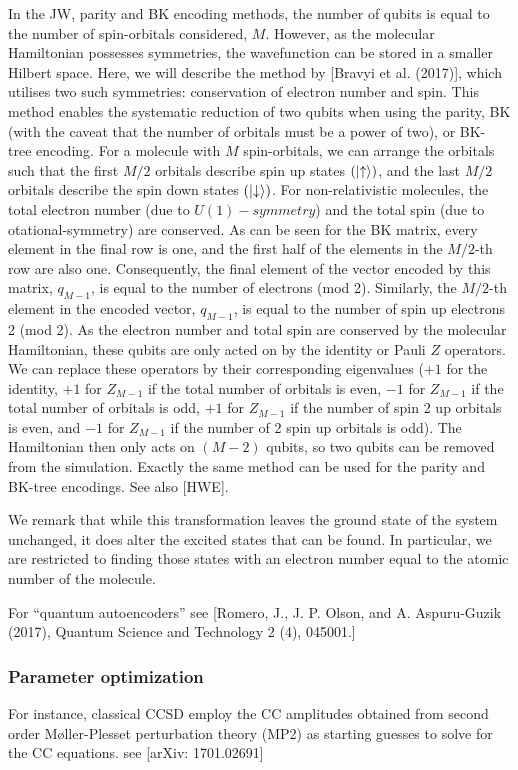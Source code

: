 \documentclass[11pt, oneside]{article}   	%
\begin{document}
In the JW, parity and BK encoding methods, the number of qubits is equal to the number of spin-orbitals considered, $M$. 
However, as the molecular Hamiltonian possesses symmetries, the wavefunction can be stored in a smaller Hilbert space. 
Here, we will describe the method by [Bravyi et al. (2017)], which utilises two such symmetries: conservation of electron number and spin. 
This method enables the systematic reduction of two qubits when using the parity, BK (with the caveat that the number of orbitals must be a power of two), or BK- tree encoding. 
For a molecule with $M$ spin-orbitals, we can arrange the orbitals such that the first $M/2$ orbitals describe spin up states $(\ket{\uparrow})$, and the last $M/2$ orbitals describe the spin down states $(\ket{\downarrow})$. 
For non-relativistic molecules, the total electron number (due to $U(1)-symmetry$) and the total spin (due to otational-symmetry) are conserved. 
As can be seen for the BK matrix, every element in the final row is one, and the first half of the elements in the $M/2$-th row are also one.
Consequently, the final element of the vector encoded by this matrix, $q_{M-1}$, is equal to the number of electrons (mod 2). 
Similarly, the $M/2$-th element in the encoded vector, $q_{M-1}$, is equal to the number of spin up electrons 2 (mod 2). 
As the electron number and total spin are conserved by the molecular Hamiltonian, these qubits are only acted on by the identity or Pauli $Z$ operators. 
We can replace these operators by their corresponding eigenvalues ($+1$ for the identity, $+1$ for $Z_{M-1}$ if the total number of orbitals is even, $-1$ for $Z_{M-1}$ if the total number of orbitals is odd, $+1$ for $Z_{M-1}$ if the number of spin 2 up orbitals is even, and $-1$ for $Z_{M-1}$ if the number of 2 spin up orbitals is odd). 
The Hamiltonian then only acts on $(M-2)$ qubits, so two qubits can be removed from the simulation. 
Exactly the same method can be used for the parity and BK-tree encodings. 
See also [HWE].

We remark that while this transformation leaves the ground state of the system unchanged, it does alter the excited states that can be found. 
In particular, we are restricted to finding those states with an electron number equal to the atomic number of the molecule.

For ``quantum autoencoders'' see [Romero, J., J. P. Olson, and A. Aspuru-Guzik (2017), Quantum Science and Technology 2 (4), 045001.]

\subsubsection{Parameter optimization}
For instance, classical CCSD employ the CC amplitudes obtained from second order Møller-Plesset perturbation theory (MP2) as starting guesses to solve for the CC equations. see [arXiv: 1701.02691]
\end{document}

